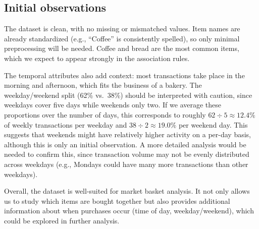 \subsection*{Initial observations}
The dataset is clean, with no missing or mismatched values.  
Item names are already standardized (e.g., ``Coffee'' is consistently spelled), 
so only minimal preprocessing will be needed.  
Coffee and bread are the most common items, 
which we expect to appear strongly in the association rules.  

The temporal attributes also add context: most transactions take place in the morning and afternoon, which fits the business of a bakery.  
The weekday/weekend split (62\% vs.\ 38\%) should be interpreted with caution, since weekdays cover five days while weekends only two.  
If we average these proportions over the number of days, this corresponds to roughly $62 \div 5 \approx 12.4\%$ of weekly transactions per weekday and $38 \div 2 \approx 19.0\%$ per weekend day.  
This suggests that weekends might have relatively higher activity on a per-day basis, although this is only an initial observation.  
A more detailed analysis would be needed to confirm this, since transaction volume may not be evenly distributed across weekdays (e.g., Mondays could have many more transactions than other weekdays).
 

Overall, the dataset is well-suited for market basket analysis.  
It not only allows us to study which items are bought together but also provides additional 
information about when purchases occur 
(time of day, weekday/weekend), which could be explored in further analysis.
